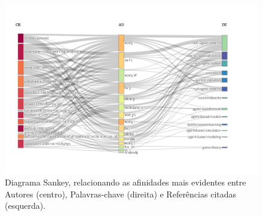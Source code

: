 \begin{figure}
    \centering
    \includegraphics[angle=90,width=1\textwidth,height=0.9\textheight]{experiments/jhcf/PesqBibliogr/SimulacaoMultiagente/WoS-20220203/Descritiva/MASSA2-Three-Fields-Plot-CR-AU-DE.png}
    \caption{Diagrama Sankey, relacionando as afinidades mais evidentes entre Autores (centro), Palavras-chave (direita) e Referências citadas (esquerda).}
    \label{fig:MASSA2:Sankey:CR-AU-DE}
\end{figure}


